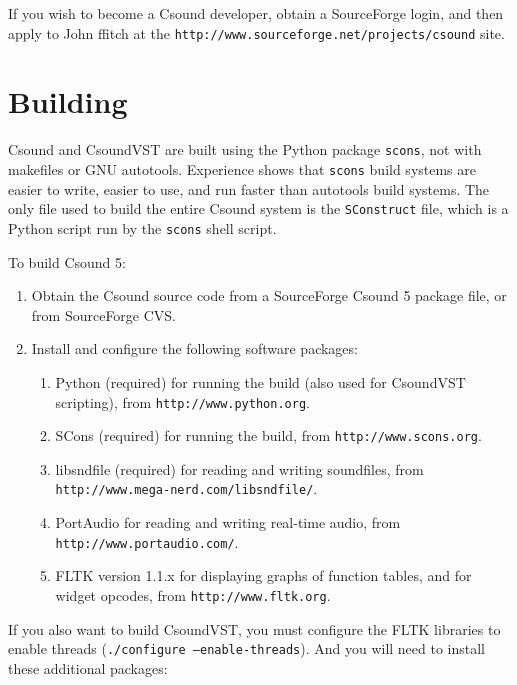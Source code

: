 \documentclass[10pt,letterpaper,onecolumn]{ltxguide}
\begin{document}
If you wish to become a Csound developer, obtain a SourceForge login, and then apply to John ffitch at the \linebreak[3] \texttt{http:\-//www.sourceforge.net/projects/\-csound} site.

\section{Building}

Csound and CsoundVST are built using the Python package \texttt{scons}, not with makefiles or GNU autotools. Experience shows that \texttt{scons} build systems are easier to write, easier to use, and run faster than autotools build systems. The only file used to build the entire Csound system is the \texttt{SConstruct} file, which is a Python script run by the \texttt{scons} shell script.

To build Csound 5:
\begin{enumerate}
\item Obtain the Csound source code from a SourceForge Csound 5 package file, or from SourceForge CVS.
\item Install and configure the following software packages:
\begin{enumerate}
\item Python (required) for running the build (also used for CsoundVST scripting), from \linebreak[3] \texttt{http:\-//www.python.org}.
\item SCons (required) for running the build, from \linebreak[4] \texttt{http:\-//www.scons.org}.
\item libsndfile (required) for reading and writing soundfiles, from \linebreak[4] \texttt{http://www.mega-nerd.com/libsndfile/}.
\item PortAudio for reading and writing real-time audio, from \linebreak[4] \texttt{http://www.portaudio.com/}.
\item FLTK version 1.1.x for displaying graphs of function tables, and for widget opcodes, from \linebreak[3] \texttt{http://www.fltk.org}.
\end{enumerate}
\end{enumerate}

If you also want to build CsoundVST, you must configure the FLTK libraries to enable threads (\texttt{./configure ---enable-threads}). And you will need to install these additional packages:
\end{document}
